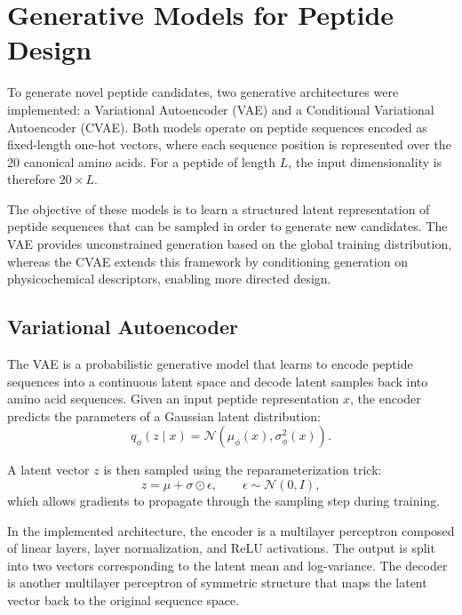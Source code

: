 
\section{Generative Models for Peptide Design}

To generate novel peptide candidates, two generative architectures were implemented: a Variational Autoencoder (VAE) and a Conditional Variational Autoencoder (CVAE). Both models operate on peptide sequences encoded as fixed-length one-hot vectors, where each sequence position is represented over the 20 canonical amino acids. For a peptide of length $L$, the input dimensionality is therefore $20 \times L$.

The objective of these models is to learn a structured latent representation of peptide sequences that can be sampled in order to generate new candidates. The VAE provides unconstrained generation based on the global training distribution, whereas the CVAE extends this framework by conditioning generation on physicochemical descriptors, enabling more directed design.

\subsection{Variational Autoencoder}

The VAE is a probabilistic generative model that learns to encode peptide sequences into a continuous latent space and decode latent samples back into amino acid sequences. Given an input peptide representation $x$, the encoder predicts the parameters of a Gaussian latent distribution:
\begin{equation}
q_{\phi}(z \mid x) = \mathcal{N}(\mu_{\phi}(x), \sigma_{\phi}^{2}(x)).
\end{equation}

A latent vector $z$ is then sampled using the reparameterization trick:
\begin{equation}
z = \mu + \sigma \odot \epsilon, \qquad \epsilon \sim \mathcal{N}(0, I),
\end{equation}
which allows gradients to propagate through the sampling step during training.

In the implemented architecture, the encoder is a multilayer perceptron composed of linear layers, layer normalization, and ReLU activations. The output is split into two vectors corresponding to the latent mean and log-variance. The decoder is another multilayer perceptron of symmetric structure that maps the latent vector back to the original sequence space.

